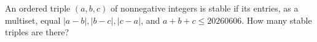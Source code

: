 An ordered triple $(a,b,c)$ of nonnegative integers is stable if its entries, as a multiset, equal $|a-b|,|b-c|,|c-a|$, and $a+b+c\le20260606$. How many stable triples are there?
